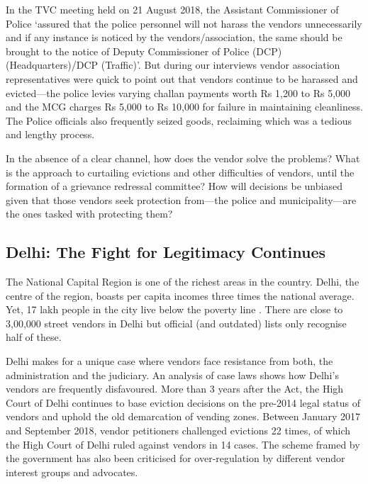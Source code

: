 \documentclass[a4paper, 12pt, twoside, table]{article}
\begin{document}
{{In the TVC meeting held on 21 August 2018, the Assistant Commissioner of Police `assured that the police personnel will not harass the vendors unnecessarily and if any instance is noticed by the vendors/association, the same should be brought to the notice of Deputy Commissioner of Police (DCP) (Headquarters)/DCP (Traffic)'. But during our interviews vendor association representatives were quick to point out that vendors continue to be harassed and evicted—the police levies varying challan payments worth Rs 1,200 to Rs 5,000 and the MCG charges Rs 5,000 to Rs 10,000 for failure in maintaining cleanliness. The Police officials also frequently seized goods, reclaiming which was a tedious and lengthy process.

In the absence of a clear channel, how does the vendor solve the problems? What is the approach to curtailing evictions and other difficulties of vendors, until the formation of a grievance redressal committee? How will decisions be unbiased given that those vendors seek protection from—the police and municipality—are the ones tasked with protecting them?

\subsection*{Delhi: The Fight for Legitimacy Continues}


The National Capital Region is one of the richest areas in the country. Delhi, the centre of the region, boasts per capita incomes three times the national average. Yet, 17 lakh people in the city live below the poverty line \parencite{delhireport}. There are close to 3,00,000 street vendors in Delhi \parencite{sewapaper} but official (and outdated) lists only recognise half of these. 

Delhi makes for a unique case where vendors face resistance from both, the administration and the judiciary. An analysis of case laws shows how Delhi’s vendors are frequently disfavoured. More than 3 years after the Act, the High Court of Delhi continues to base eviction decisions on the pre-2014 legal status of vendors and uphold the old demarcation of vending zones. Between January 2017 and September 2018, vendor petitioners challenged evictions 22 times, of which the High Court of Delhi ruled against vendors in 14 cases. The scheme framed by the government has also been criticised for over-regulation by different vendor interest groups and advocates. 

}}
\end{document}
